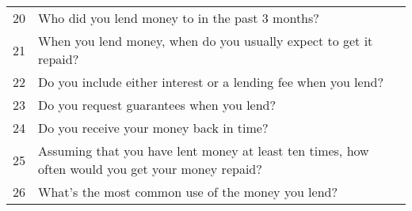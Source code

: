 \begin{longtable}[]{@{}ll@{}}
\begin{minipage}[t]{0.05\columnwidth}\raggedright
20\strut
\end{minipage} & \begin{minipage}[t]{0.89\columnwidth}\raggedright
Who did you lend money to in the past 3 months?\strut
\end{minipage}\tabularnewline
\begin{minipage}[t]{0.05\columnwidth}\raggedright
21\strut
\end{minipage} & \begin{minipage}[t]{0.89\columnwidth}\raggedright
When you lend money, when do you usually expect to get it repaid?\strut
\end{minipage}\tabularnewline
\begin{minipage}[t]{0.05\columnwidth}\raggedright
22\strut
\end{minipage} & \begin{minipage}[t]{0.89\columnwidth}\raggedright
Do you include either interest or a lending fee when you lend?\strut
\end{minipage}\tabularnewline
\begin{minipage}[t]{0.05\columnwidth}\raggedright
23\strut
\end{minipage} & \begin{minipage}[t]{0.89\columnwidth}\raggedright
Do you request guarantees when you lend?\strut
\end{minipage}\tabularnewline
\begin{minipage}[t]{0.05\columnwidth}\raggedright
24\strut
\end{minipage} & \begin{minipage}[t]{0.89\columnwidth}\raggedright
Do you receive your money back in time?\strut
\end{minipage}\tabularnewline
\begin{minipage}[t]{0.05\columnwidth}\raggedright
25\strut
\end{minipage} & \begin{minipage}[t]{0.89\columnwidth}\raggedright
Assuming that you have lent money at least ten times, how often would
you get your money repaid?\strut
\end{minipage}\tabularnewline
\begin{minipage}[t]{0.05\columnwidth}\raggedright
26\strut
\end{minipage} & \begin{minipage}[t]{0.89\columnwidth}\raggedright
What's the most common use of the money you lend?\strut
\end{minipage}\tabularnewline

\end{longtable}
